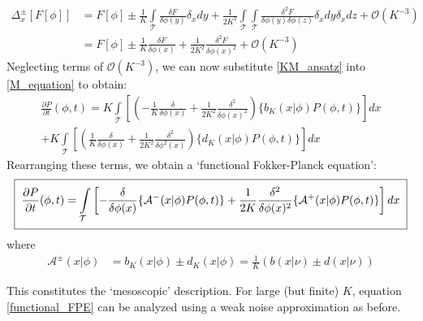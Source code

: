 \begin{align}
    \Delta^{\pm}_{x}[F[\phi]] &= F[\phi] \pm \frac{1}{K}\int\limits_{\mathcal{T}}\frac{\delta F}{\delta \phi(y)}\delta_xdy + \frac{1}{2K^2}\int\limits_{\mathcal{T}}\int\limits_{\mathcal{T}}\frac{\delta^2 F}{\delta \phi(y)\delta \phi(z)}\delta_xdy\delta_xdz+\mathcal{O}(K^{-3})\nonumber\\
    &= F[\phi] \pm \frac{1}{K}\frac{\delta F}{\delta \phi(x)} + \frac{1}{2K^2}\frac{\delta^2 F}{\delta \phi(x)^2}+\mathcal{O}(K^{-3})
    \label{KM_ansatz}
\end{align}
Neglecting terms of $\mathcal{O}(K^{-3})$, we can now substitute \eqref{KM_ansatz} into \eqref{M_equation} to obtain:
\begin{equation*}
\begin{split}
\frac{\partial P}{\partial t}(\phi,t) = K\int\limits_{\mathcal{T}}\left[
    \left(-\frac{1}{K}\frac{\delta}{\delta\phi(x)} + \frac{1}{2K^2}\frac{\delta^2}{\delta\phi(x)^2}\right)\{b_K(x|\phi)P(\phi,t)\}\right]dx\\
    +K\int\limits_{\mathcal{T}}\left[\left(\frac{1}{K}\frac{\delta}{\delta\phi(x)} + \frac{1}{2K^2}\frac{\delta^2}{\delta\phi^2(x)}\right)\{d_K(x|\phi)P(\phi,t)\}\right]dx
\end{split}
\end{equation*}
Rearranging these terms, we obtain a `functional Fokker-Planck equation':
\begin{equation}
\label{functional_FPE}
\setlength{\fboxsep}{2\fboxsep}\boxed{\frac{\partial P}{\partial t}(\phi,t) = \int\limits_{\mathcal{T}}\left[-
    \frac{\delta}{\delta\phi(x)}\{\mathcal{A}^{-}(x|\phi)P(\phi,t)\} + \frac{1}{2K}\frac{\delta^2}{\delta\phi(x)^2}\{\mathcal{A}^{+}(x|\phi)P(\phi,t)\}\right]dx}
\end{equation}
where
\begin{align*}
   \mathcal{A}^{\pm}(x|\phi) &= b_K(x|\phi)\pm d_K(x|\phi) = \frac{1}{K}\left(b(x|\nu)\pm d(x|\nu)\right)
\end{align*}

This constitutes the `mesoscopic' description. For large (but finite) $K$, equation \eqref{functional_FPE} can be analyzed using a weak noise approximation as before.

